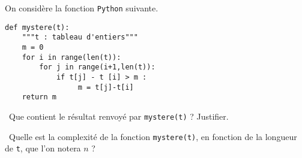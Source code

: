 \exer{}
\setcounter{numques}{0}

On considère la fonction \texttt{Python} suivante. 
\begin{lstlisting}
def mystere(t):
    """t : tableau d'entiers"""
    m = 0
    for i in range(len(t)):
        for j in range(i+1,len(t)):
            if t[j] - t [i] > m :
                 m = t[j]-t[i]
    return m
\end{lstlisting}

\medskip

\question\ Que contient le résultat renvoyé par \texttt{mystere(t)} ? Justifier. 

\medskip

\question\ Quelle est la complexité de la fonction \texttt{mystere(t)}, en fonction de la longueur de \texttt{t}, que l'on notera $n$ ? 